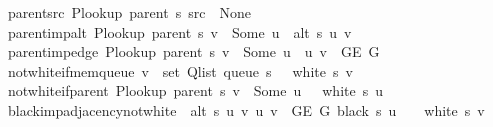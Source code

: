 \begin{isabellebody}
\ \ \ parent{\isacharunderscore}{\kern0pt}src{\isacharcolon}{\kern0pt}\ {\isachardoublequoteopen}P{\isacharunderscore}{\kern0pt}lookup\ {\isacharparenleft}{\kern0pt}parent\ s{\isacharparenright}{\kern0pt}\ src\ {\isacharequal}{\kern0pt}\ None{\isachardoublequoteclose}\isanewline
\ \ \ parent{\isacharunderscore}{\kern0pt}imp{\isacharunderscore}{\kern0pt}alt{\isacharcolon}{\kern0pt}\ {\isachardoublequoteopen}P{\isacharunderscore}{\kern0pt}lookup\ {\isacharparenleft}{\kern0pt}parent\ s{\isacharparenright}{\kern0pt}\ v\ {\isacharequal}{\kern0pt}\ Some\ u\ {\isasymLongrightarrow}\ alt\ s\ u\ v{\isachardoublequoteclose}\isanewline
\ \ \ parent{\isacharunderscore}{\kern0pt}imp{\isacharunderscore}{\kern0pt}edge{\isacharcolon}{\kern0pt}\ {\isachardoublequoteopen}P{\isacharunderscore}{\kern0pt}lookup\ {\isacharparenleft}{\kern0pt}parent\ s{\isacharparenright}{\kern0pt}\ v\ {\isacharequal}{\kern0pt}\ Some\ u\ {\isasymLongrightarrow}\ {\isacharbraceleft}{\kern0pt}u{\isacharcomma}{\kern0pt}\ v{\isacharbraceright}{\kern0pt}\ {\isasymin}\ G{\isachardot}{\kern0pt}E\ G{\isachardoublequoteclose}\isanewline
\ \ \ not{\isacharunderscore}{\kern0pt}white{\isacharunderscore}{\kern0pt}if{\isacharunderscore}{\kern0pt}mem{\isacharunderscore}{\kern0pt}queue{\isacharcolon}{\kern0pt}\ {\isachardoublequoteopen}v\ {\isasymin}\ set\ {\isacharparenleft}{\kern0pt}Q{\isacharunderscore}{\kern0pt}list\ {\isacharparenleft}{\kern0pt}queue\ s{\isacharparenright}{\kern0pt}{\isacharparenright}{\kern0pt}\ {\isasymLongrightarrow}\ {\isasymnot}\ white\ s\ v{\isachardoublequoteclose}\isanewline
\ \ \ not{\isacharunderscore}{\kern0pt}white{\isacharunderscore}{\kern0pt}if{\isacharunderscore}{\kern0pt}parent{\isacharcolon}{\kern0pt}\ {\isachardoublequoteopen}P{\isacharunderscore}{\kern0pt}lookup\ {\isacharparenleft}{\kern0pt}parent\ s{\isacharparenright}{\kern0pt}\ v\ {\isacharequal}{\kern0pt}\ Some\ u\ {\isasymLongrightarrow}\ {\isasymnot}\ white\ s\ u{\isachardoublequoteclose}\isanewline
\ \ \ black{\isacharunderscore}{\kern0pt}imp{\isacharunderscore}{\kern0pt}adjacency{\isacharunderscore}{\kern0pt}not{\isacharunderscore}{\kern0pt}white{\isacharcolon}{\kern0pt}\ {\isachardoublequoteopen}{\isasymlbrakk}\ alt\ s\ u\ v{\isacharsemicolon}{\kern0pt}\ {\isacharbraceleft}{\kern0pt}u{\isacharcomma}{\kern0pt}\ v{\isacharbraceright}{\kern0pt}\ {\isasymin}\ G{\isachardot}{\kern0pt}E\ G{\isacharsemicolon}{\kern0pt}\ black\ s\ u\ {\isasymrbrakk}\ {\isasymLongrightarrow}\ {\isasymnot}\ white\ s\ v{\isachardoublequoteclose}\isanewline

\end{isabellebody}
